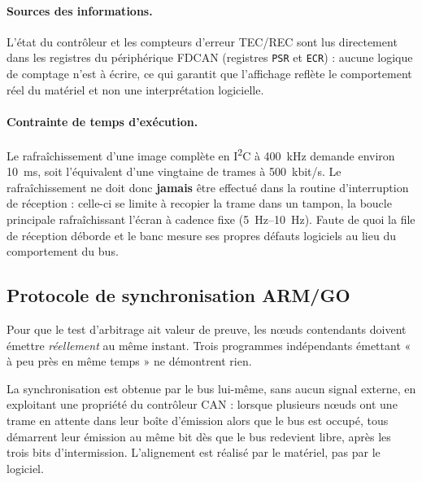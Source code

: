 \documentclass[11pt,a4paper]{article}
\begin{document}
\paragraph{Sources des informations.} L'état du contrôleur et les compteurs d'erreur TEC/REC
sont lus directement dans les registres du périphérique FDCAN (registres \texttt{PSR} et
\texttt{ECR}) : aucune logique de comptage n'est à écrire, ce qui garantit que l'affichage
reflète le comportement réel du matériel et non une interprétation logicielle.

\paragraph{Contrainte de temps d'exécution.} Le rafraîchissement d'une image complète en
I\textsuperscript{2}C à \SI{400}{kHz} demande environ \SI{10}{ms}, soit l'équivalent d'une
vingtaine de trames à \SI{500}{kbit/s}. Le rafraîchissement ne doit donc
\textbf{jamais} être effectué dans la routine d'interruption de réception : celle-ci se limite
à recopier la trame dans un tampon, la boucle principale rafraîchissant l'écran à cadence
fixe (\SIrange{5}{10}{Hz}). Faute de quoi la file de réception déborde et le banc mesure ses
propres défauts logiciels au lieu du comportement du bus.

\subsection{Protocole de synchronisation ARM/GO}
\label{sec:armgo}

Pour que le test d'arbitrage ait valeur de preuve, les nœuds contendants doivent émettre
\emph{réellement} au même instant. Trois programmes indépendants émettant « à peu près en
même temps » ne démontrent rien.

La synchronisation est obtenue par le bus lui-même, sans aucun signal externe, en exploitant
une propriété du contrôleur CAN : lorsque plusieurs nœuds ont une trame en attente dans leur
boîte d'émission alors que le bus est occupé, tous démarrent leur émission au même bit dès
que le bus redevient libre, après les trois bits d'intermission. L'alignement est réalisé par
le matériel, pas par le logiciel.
\end{document}

